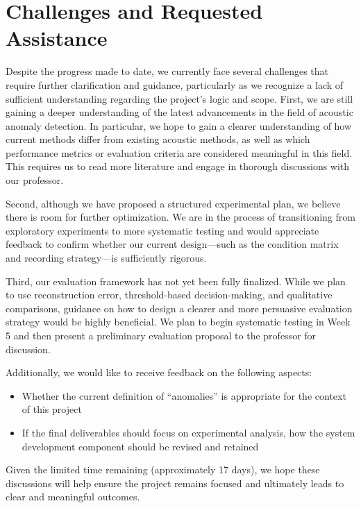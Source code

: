 \documentclass[11pt]{article}
\begin{document}
\section{Challenges and Requested Assistance}

Despite the progress made to date, we currently face several challenges that require further clarification and guidance, particularly as we recognize a lack of sufficient understanding regarding the project’s logic and scope. First, we are still gaining a deeper understanding of the latest advancements in the field of acoustic anomaly detection. In particular, we hope to gain a clearer understanding of how current methods differ from existing acoustic methods, as well as which performance metrics or evaluation criteria are considered meaningful in this field. This requires us to read more literature and engage in thorough discussions with our professor.

Second, although we have proposed a structured experimental plan, we believe there is room for further optimization. We are in the process of transitioning from exploratory experiments to more systematic testing and would appreciate feedback to confirm whether our current design—such as the condition matrix and recording strategy—is sufficiently rigorous.

Third, our evaluation framework has not yet been fully finalized. While we plan to use reconstruction error, threshold-based decision-making, and qualitative comparisons, guidance on how to design a clearer and more persuasive evaluation strategy would be highly beneficial. We plan to begin systematic testing in Week 5 and then present a preliminary evaluation proposal to the professor for discussion.

Additionally, we would like to receive feedback on the following aspects:

\begin{itemize}
\item Whether the current definition of “anomalies” is appropriate for the context of this project
\item If the final deliverables should focus on experimental analysis, how the system development component should be revised and retained
\end{itemize}

Given the limited time remaining (approximately 17 days), we hope these discussions will help ensure the project remains focused and ultimately leads to clear and meaningful outcomes.
\end{document}
